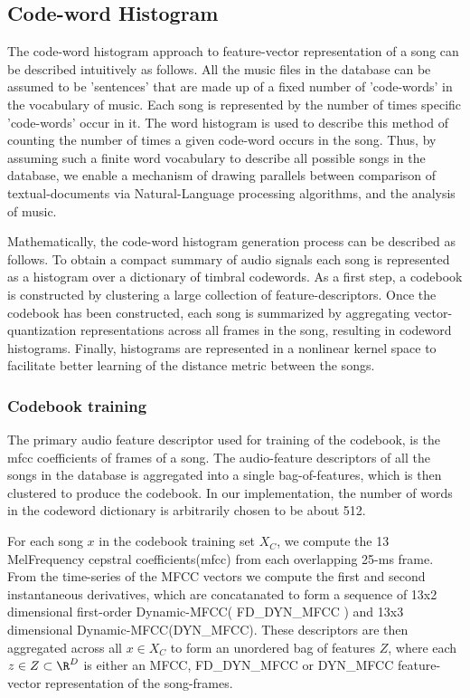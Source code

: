 \documentclass[12pt]{article}
\begin{document}
\subsection{Code-word Histogram}
The code-word histogram \cite{codewordHist} approach to feature-vector representation of a song can be described intuitively as follows. All the music files in the database can be assumed to be 'sentences' that are made up of a fixed number of 'code-words' in the vocabulary of music. Each song is represented by the number of times specific 'code-words' occur in it. The word histogram is used to describe this method of counting the number of times a given code-word occurs in the song. Thus, by assuming such a finite word vocabulary to describe all possible songs in the database, we enable a  mechanism of drawing parallels between comparison of textual-documents via Natural-Language processing algorithms, and the analysis of music. 

Mathematically, the code-word histogram generation process can be described as follows. To obtain a compact summary of audio signals each song is represented as a histogram over a dictionary of timbral codewords. As a first step, a codebook is constructed by clustering a large collection of feature-descriptors. Once the codebook has been constructed, each song is summarized by aggregating vector-quantization representations across all frames in the song, resulting in codeword histograms. Finally, histograms are represented in a nonlinear kernel space to facilitate better learning of the distance metric between the songs. 

\subsubsection{Codebook training}
The primary audio feature descriptor used for training of the codebook, is the mfcc coefficients of frames of a song. The audio-feature descriptors of all the songs in the database is aggregated into a single bag-of-features, which is then clustered to produce the codebook. In our implementation, the number of words in the codeword dictionary is arbitrarily chosen to be about 512. 

For each song $x$ in the codebook training set $X_C$, we compute the 13 MelFrequency cepstral coefficients(mfcc) from each overlapping 25-ms frame. From the time-series of the MFCC vectors we compute the first and second instantaneous derivatives, which are concatanated to form a sequence of 13x2 dimensional first-order Dynamic-MFCC( FD_DYN_MFCC ) and 13x3 dimensional Dynamic-MFCC(DYN_MFCC). These descriptors are then aggregated across all $x \in X_C$ to form an unordered bag of features $Z$, where each $z \in Z \subset \R^D$ is either an MFCC, FD_DYN_MFCC or DYN_MFCC feature-vector representation of the song-frames.
\end{document}
